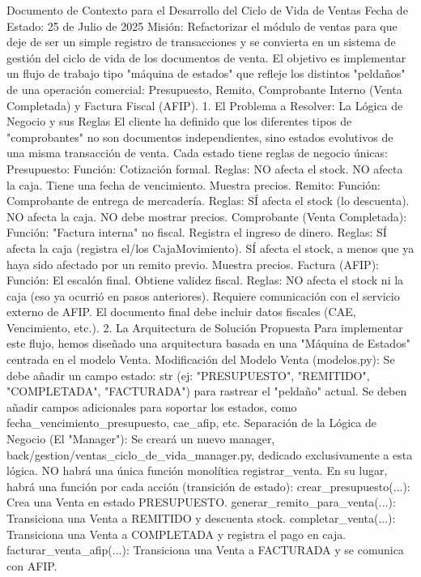 Documento de Contexto para el Desarrollo del Ciclo de Vida de Ventas
Fecha de Estado: 25 de Julio de 2025
Misión: Refactorizar el módulo de ventas para que deje de ser un simple registro de transacciones y se convierta en un sistema de gestión del ciclo de vida de los documentos de venta. El objetivo es implementar un flujo de trabajo tipo "máquina de estados" que refleje los distintos "peldaños" de una operación comercial: Presupuesto, Remito, Comprobante Interno (Venta Completada) y Factura Fiscal (AFIP).
1. El Problema a Resolver: La Lógica de Negocio y sus Reglas
El cliente ha definido que los diferentes tipos de "comprobantes" no son documentos independientes, sino estados evolutivos de una misma transacción de venta. Cada estado tiene reglas de negocio únicas:
Presupuesto:
Función: Cotización formal.
Reglas:
NO afecta el stock.
NO afecta la caja.
Tiene una fecha de vencimiento.
Muestra precios.
Remito:
Función: Comprobante de entrega de mercadería.
Reglas:
SÍ afecta el stock (lo descuenta).
NO afecta la caja.
NO debe mostrar precios.
Comprobante (Venta Completada):
Función: "Factura interna" no fiscal. Registra el ingreso de dinero.
Reglas:
SÍ afecta la caja (registra el/los CajaMovimiento).
SÍ afecta el stock, a menos que ya haya sido afectado por un remito previo.
Muestra precios.
Factura (AFIP):
Función: El escalón final. Obtiene validez fiscal.
Reglas:
NO afecta el stock ni la caja (eso ya ocurrió en pasos anteriores).
Requiere comunicación con el servicio externo de AFIP.
El documento final debe incluir datos fiscales (CAE, Vencimiento, etc.).
2. La Arquitectura de Solución Propuesta
Para implementar este flujo, hemos diseñado una arquitectura basada en una "Máquina de Estados" centrada en el modelo Venta.
Modificación del Modelo Venta (modelos.py):
Se debe añadir un campo estado: str (ej: "PRESUPUESTO", "REMITIDO", "COMPLETADA", "FACTURADA") para rastrear el "peldaño" actual.
Se deben añadir campos adicionales para soportar los estados, como fecha_vencimiento_presupuesto, cae_afip, etc.
Separación de la Lógica de Negocio (El "Manager"):
Se creará un nuevo manager, back/gestion/ventas_ciclo_de_vida_manager.py, dedicado exclusivamente a esta lógica.
NO habrá una única función monolítica registrar_venta. En su lugar, habrá una función por cada acción (transición de estado):
crear_presupuesto(...): Crea una Venta en estado PRESUPUESTO.
generar_remito_para_venta(...): Transiciona una Venta a REMITIDO y descuenta stock.
completar_venta(...): Transiciona una Venta a COMPLETADA y registra el pago en caja.
facturar_venta_afip(...): Transiciona una Venta a FACTURADA y se comunica con AFIP.
